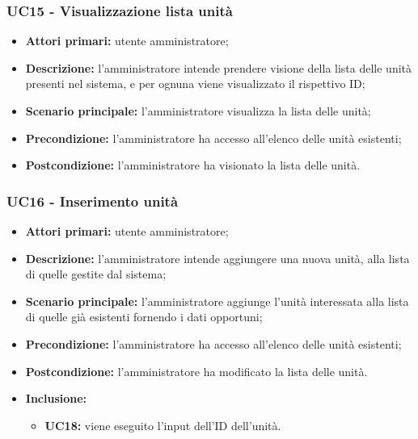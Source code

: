 \subsubsection{UC15 - Visualizzazione lista unità}
\begin{itemize}
	\item \textbf{Attori primari:} utente amministratore;
	\item \textbf{Descrizione:} l'amministratore intende prendere visione della lista delle unità presenti nel sistema, e per ognuna viene visualizzato il rispettivo ID;
	\item \textbf{Scenario principale:} l'amministratore visualizza la lista delle unità;
	\item \textbf{Precondizione:} l'amministratore ha accesso all'elenco delle unità esistenti;
	\item \textbf{Postcondizione:} l'amministratore ha visionato la lista delle unità.
\end{itemize}


\subsubsection{UC16 - Inserimento unità}
	\begin{itemize}
		\item \textbf{Attori primari:} utente amministratore;
		\item \textbf{Descrizione:} l'amministratore intende aggiungere una nuova unità, alla lista di quelle gestite dal sistema;
		\item \textbf{Scenario principale:} l'amministratore aggiunge l'unità interessata alla lista di quelle già esistenti fornendo i dati opportuni;
		\item \textbf{Precondizione:} l'amministratore ha accesso all'elenco delle unità esistenti;
		\item \textbf{Postcondizione:} l'amministratore ha modificato la lista delle unità.
		\item \textbf{Inclusione:} 
		\begin{itemize}
			\item \textbf{UC18:} viene eseguito l'input dell'ID dell'unità.
		\end{itemize}
	\end{itemize}

